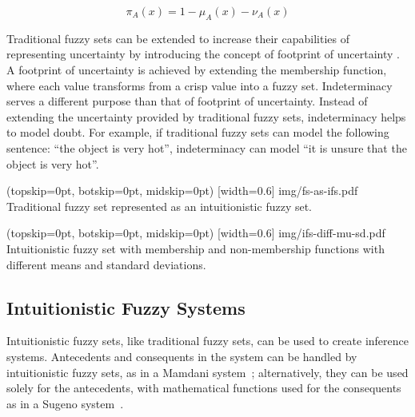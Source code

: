 \documentclass{ieeeaccess}
\begin{document}
\begin{equation}
  \label{eq:indeterminacy}
  \pi_{A}(x) = 1 - \mu_{A}(x) - \nu_{A}(x)
\end{equation}

Traditional fuzzy sets can be extended to increase their capabilities of
representing uncertainty by introducing the concept of footprint of
uncertainty \cite{Mendel2002} \cite{Mendel2006}. 
A footprint of uncertainty is achieved by extending the membership
function, where each value transforms from a crisp value into a fuzzy set.
Indeterminacy serves a different purpose than that of footprint
of uncertainty. %
Instead of extending the uncertainty provided by traditional
fuzzy sets, indeterminacy helps to model doubt. For example, if traditional
fuzzy sets can model the following sentence: ``the object is very hot'',
indeterminacy can model ``it is unsure that the object is very hot''.

\Figure[](topskip=0pt, botskip=0pt, midskip=0pt)
[width=0.6\linewidth]
{img/fs-as-ifs.pdf}
{Traditional fuzzy set represented as an intuitionistic fuzzy set.
  \label{figure:fs-as-ifs}}

\Figure[](topskip=0pt, botskip=0pt, midskip=0pt)
[width=0.6\linewidth]
{img/ifs-diff-mu-sd.pdf}
{Intuitionistic fuzzy set with membership and non-membership functions with different means and standard deviations.
  \label{figure:ifs-diff-mu-sd}}

\subsection{Intuitionistic Fuzzy Systems}
\label{subsection:intuitionistic-fuzzy-systems}

Intuitionistic fuzzy sets, like traditional fuzzy sets, can be used to create
inference systems. Antecedents and consequents in the system can be handled by
intuitionistic fuzzy sets, as in a Mamdani system~\cite{Mamdani1975}; alternatively, they can be used solely for
the antecedents, with mathematical functions used for the consequents as in a
Sugeno system~\cite{Takagi1985}.
\end{document}
